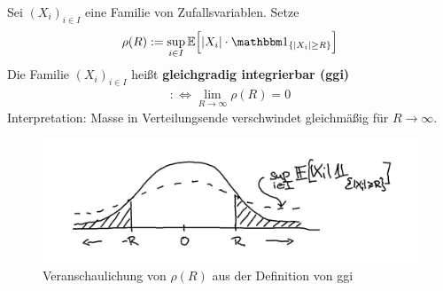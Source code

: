 \begin{defi}
Sei $(X_i)_{i\in I}$ eine Familie von Zufallsvariablen. Setze
\begin{align*}
\rho(R):=\sup\limits_{i\in I}\E\Big[|X_i|\cdot\indi_{\lbrace |X_i|\geq R\rbrace}\Big]
\end{align*}
Die Familie $(X_i)_{i\in I}$ heißt \textbf{gleichgradig integrierbar (ggi)}
\begin{align*}
:\Longleftrightarrow\lim\limits_{R\to\infty}\rho(R)=0
\end{align*}
Interpretation: Masse in Verteilungsende verschwindet gleichmäßig für $R\to\infty$.
\begin{figure}[!ht]
	\begin{center}
		\includegraphics[width=\textwidth]{pics/Sketch3.png}
		\caption{Veranschaulichung von $\rho(R)$ aus der Definition von ggi}
		\label{AbbRhoGGI}
	\end{center}
\end{figure}
\end{defi}

